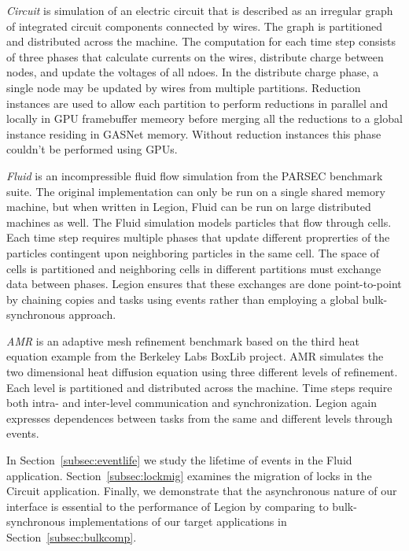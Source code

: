 {\em Circuit} is simulation of an electric circuit that is described as an
irregular graph of integrated
circuit components connected by wires.  The graph is partitioned
and distributed across the machine.  The computation for each time step consists
of three phases that calculate currents on the wires, distribute charge between
nodes, and update the voltages of all ndoes.  In the distribute charge
phase, a single node may be updated by wires from multiple partitions.  Reduction instances 
are used to allow each partition to perform reductions in parallel and locally in GPU
framebuffer memeory before merging all the reductions to a global instance
residing in GASNet memory.  Without reduction instances this phase
couldn't be performed using GPUs.

{\em Fluid} is an incompressible fluid flow simulation from the PARSEC
benchmark suite\cite{bienia11benchmarking}.  The original implementation can 
only be run on a single shared memory machine, but when written in Legion, Fluid can
be run on large distributed machines as well.  The Fluid simulation
models particles that flow through cells.  Each time step requires multiple phases
that update different proprerties of the particles contingent upon neighboring
particles in the same cell.  The space of cells is partitioned and neighboring
cells in different partitions must exchange data between phases.  Legion ensures
that these exchanges are done point-to-point by chaining copies and tasks
using events rather than employing a global bulk-synchronous approach.

{\em AMR} is an adaptive mesh refinement benchmark based on the third heat
equation example from the Berkeley Labs BoxLib project\cite{BoxLib}.  AMR
simulates the two dimensional heat diffusion equation using three different levels
of refinement.  Each level is partitioned and distributed across the machine.  Time steps require
both intra- and inter-level communication and synchronization.  Legion again
expresses dependences between tasks from the same and different levels through
events.

In Section~\ref{subsec:eventlife} we study the lifetime of events in
the Fluid application.  Section~\ref{subsec:lockmig} examines
the migration of locks in the Circuit application.  Finally, we demonstrate
that the asynchronous nature of our interface is essential to the
performance of Legion by comparing to bulk-synchronous
implementations of our target applications in Section~\ref{subsec:bulkcomp}.
  
